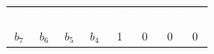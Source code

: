 \begin{tabular}{cccccccc}\rowcolor{DEplava}\textcolor{white}{$D_7$}&\textcolor{white}{$D_6$}&\textcolor{white}{$D_5$}&\textcolor{white}{$D_4$}&\textcolor{white}{$D_3$}&\textcolor{white}{$D_2$}&\textcolor{white}{$D_1$}&\textcolor{white}{$D_0$}\\\rowcolor{DEplava!12}$b_7$&$b_6$&$b_5$&$b_4$&\textcolor{DEcrvena}{1}&\textcolor{DEcrvena}{0}&\textcolor{DEcrvena}{0}&\textcolor{DEcrvena}{0}\end{tabular}
